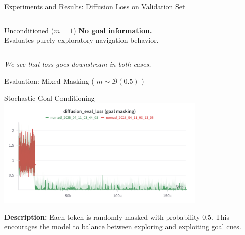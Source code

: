 \documentclass{beamer}
\begin{document}
\begin{frame}{Experiments and Results: Diffusion Loss on Validation Set}
\begin{columns}
\begin{column}{0.48\textwidth}
\begin{block}{\centering Unconditioned ($m = 1$)}
                    \vspace{0.5em}
                    \tiny \textbf{No goal information.} \\
                    Evaluates purely exploratory navigation behavior.
                \end{block}
            \end{column}
        \end{columns}
        
        \vspace{0.7em}
        \centering
        \small \textit{We see that loss goes downstream in both cases.}
    \end{frame}

    \begin{frame}{Evaluation: Mixed Masking ( $m \sim \mathcal{B}(0.5)$ )}
        \begin{block}{Stochastic Goal Conditioning}
            \centering
            \includegraphics[width=0.75\textwidth]{images/diff_eval_goal_masking.png}
            
            \vspace{0.5em}
            \small
            \textbf{Description:} 
            Each token is randomly masked with probability 0.5. This encourages the model to balance between exploring and exploiting goal cues.
        \end{block}
    \end{frame}
\end{document}
